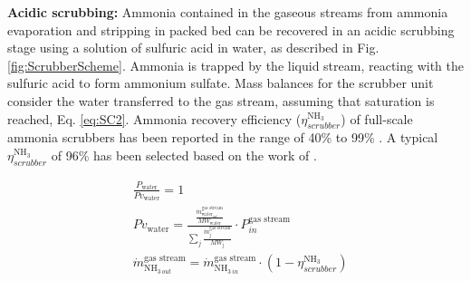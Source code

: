 \begin{refsection}[referencesCh6]

\textbf{Acidic scrubbing:} Ammonia contained in the gaseous streams from
ammonia evaporation
and stripping in packed bed
can be recovered in an acidic scrubbing stage using a solution of sulfuric acid in water, as described in Fig. \ref{fig:ScrubberScheme}. Ammonia is trapped by the liquid stream, reacting with the sulfuric acid to form ammonium sulfate.
Mass balances for the scrubber unit consider the water transferred to the gas stream, assuming that saturation is reached, Eq. \ref{eq:SC2}. Ammonia  recovery efficiency ($\eta_{scrubber}^{\text{NH}_3}$) of full-scale ammonia scrubbers has been reported in the range of 40\% to 99\% \citep{melse2005}. A typical $\eta_{scrubber}^{\text{NH}_3}$ of 96\% has been selected based on the work of \citet{melse2005}.


\begin{align}
& \frac{P_{\text{water}}}{Pv_{\text{water}}} = 1 \label{eq:SC1} 
\\
& Pv_{\text{water}} = \frac{\frac{\dot{m}_{\text{water}_{out}}^{\text{gas stream}}}{MW_\text{water}}}
{\sum_{j}\frac{\dot{m}_{\text{j}}^{\text{gas stream}}}{MW_\text{j}}}
\cdot P_{in}^{\text{gas stream}} \label{eq:SC2} 
\\
& \dot{m}_{\text{NH}_{3 \ out}}^{\text{gas stream}} = \dot{m}_{\text{NH}_{3 \ in}}^{\text{gas stream}} \cdot \left(1-\eta_{scrubber}^{\text{NH}_3}\right) \label{eq:SC3}
\end{align}


\end{refsection}
